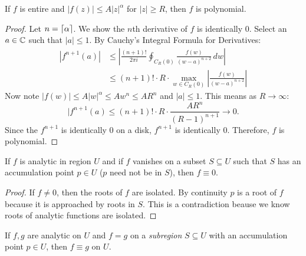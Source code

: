 \begin{theorem}
    If $f$ is entire and $|f(z)| \le A|z|^{\alpha}$ for
    $|z| \ge R$, then $f$ is polynomial.
\end{theorem}

\begin{proof}
    Let $n = \left \lceil{\alpha}\right \rceil$.
    We show the $n$th derivative of $f$ is identically $0$.
    Select an $a \in \operatorname{\mathbb{C}}$ such that $|a| \le 1$.
    By Cauchy's Integral Formula for Derivatives:
    \begin{align*}
        |f^{n+1}(a)| &\le \left| \frac{(n+1)!}{2\pi i} \oint_{C_R(0)}
        \frac{f(w)}{{(w-a)}^{n+2}} \, dw \right| \\
        &\le (n+1)! \cdot R \cdot \max_{w \in C_R(0)} 
        \left|\frac{f(w)}{{(w-a)}^{n+2}}\right| \tag{ML Theorem}
    \end{align*}
    Now note $|f(w)| \le A|w|^{\alpha} \le Aw^n \le AR^n$ and
    $|a| \le 1$.
    This means as $R \to \infty$:
    \[ |f^{n+1}(a) \le (n+1)! \cdot R \cdot \frac{AR^n}{{(R-1)}^{n+1}} \to 0. \]
    Since the $f^{n+1}$ is identically $0$ on a disk,
    $f^{n+1}$ is identically $0$.
    Therefore, $f$ is polynomial.
\end{proof}


\begin{theorem}
    If $f$ is analytic in region $U$ and if $f$ vanishes on a
    subset $S \subseteq U$ such that $S$ has an accumulation
    point $p \in U$ ($p$ need not be in $S$), then $f \equiv 0$.
\end{theorem}

\begin{proof}
    If $f \ne 0$, then the roots of $f$ are isolated.
    By continuity $p$ is a root of $f$ because it is approached
    by roots in $S$.
    This is a contradiction beause we know roots of analytic
    functions are isolated.
\end{proof}

\begin{cor}
    If $f, g$ are analytic on $U$ and $f=g$ on 
    a \textit{subregion}
    $S \subseteq U$
    with an accumulation point $p \in U$, then $f \equiv g$ 
    on $U$.
\end{cor}


